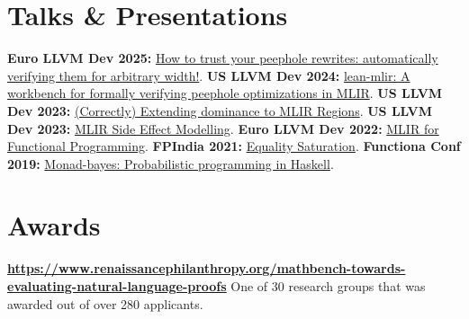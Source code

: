 \documentclass[11pt,a4paper,sans,colorlinks]{moderncv}        %
\begin{document}




\section{Talks \& Presentations}


\textbf{Euro LLVM Dev 2025:} \href{https://www.youtube.com/watch?v=WtsInfbzxjs}{How to trust your peephole rewrites: automatically verifying them for arbitrary width!}.
\textbf{US LLVM Dev 2024:} \href{https://www.youtube.com/watch?v=4lh2NnLOxvQ}{lean-mlir: A workbench for formally verifying peephole optimizations in MLIR}.
\textbf{US LLVM Dev 2023:} \href{https://www.youtube.com/watch?v=VJORFvHJKWE}{(Correctly) Extending dominance to MLIR Regions}.
\textbf{US LLVM Dev 2023:} \href{https://www.youtube.com/watch?v=6bDKasLZyxU}{MLIR Side Effect Modelling}.
\textbf{Euro LLVM Dev 2022:} \href{https://www.youtube.com/watch?v=cyMQbZ0B84Q}{MLIR for Functional Programming}.
\textbf{FPIndia 2021:} \href{https://www.youtube.com/watch?v=cfdII1jDJYU}{Equality Saturation}.
\textbf{Functiona Conf 2019:} \href{https://confengine.com/conferences/functional-conf-2019/proposals}{Monad-bayes: Probabilistic programming in Haskell}.

\section{Awards}

\textbf{\href{Renaissance Philanthropy, AI for Maths for 'Towards evaluating Natural Language Profs'}{https://www.renaissancephilanthropy.org/mathbench-towards-evaluating-natural-language-proofs}} One of 30 research groups that was awarded out of over 280 applicants.
\end{document}
